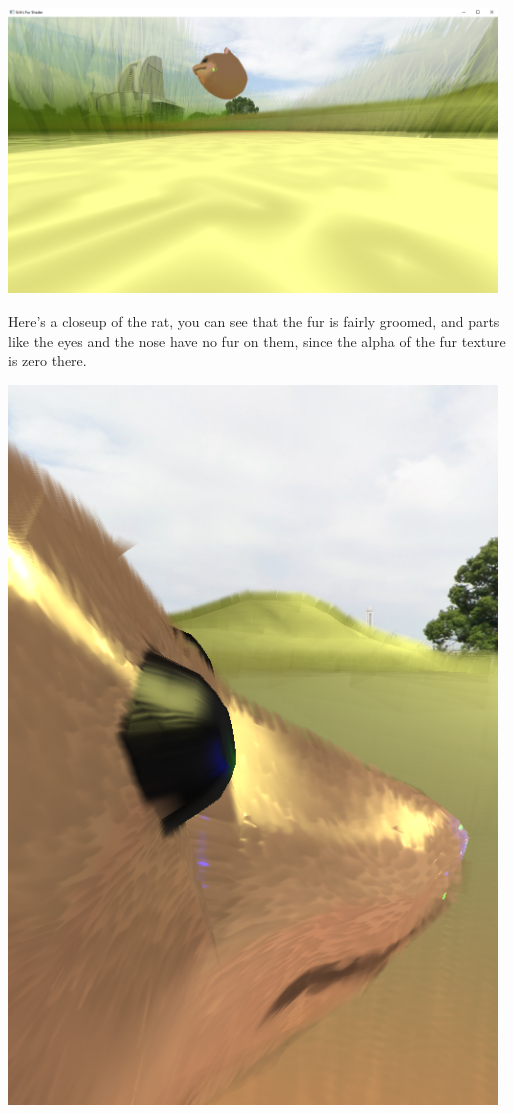 \documentclass[a4paper, 12pt]{article}
\begin{document}
    \includegraphics[width=35em]{grounded}


    Here's a closeup of the rat,
    you can see that the fur is fairly groomed,
    and parts like the eyes and the nose have no fur on them, since the alpha of the fur texture is zero there.

    \includegraphics[width=35em]{groomed}
\end{document}

